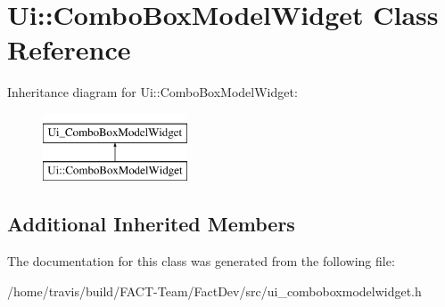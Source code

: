 \hypertarget{classUi_1_1ComboBoxModelWidget}{\section{Ui\-:\-:Combo\-Box\-Model\-Widget Class Reference}
\label{classUi_1_1ComboBoxModelWidget}
}
Inheritance diagram for Ui\-:\-:Combo\-Box\-Model\-Widget\-:\begin{figure}[H]
\begin{center}
\leavevmode
\includegraphics[height=2.000000cm]{da/dd8/classUi_1_1ComboBoxModelWidget}
\end{center}
\end{figure}
\subsection*{Additional Inherited Members}


The documentation for this class was generated from the following file\-:\begin{DoxyCompactItemize}
\item 
/home/travis/build/\-F\-A\-C\-T-\/\-Team/\-Fact\-Dev/src/ui\-\_\-comboboxmodelwidget.\-h\end{DoxyCompactItemize}
